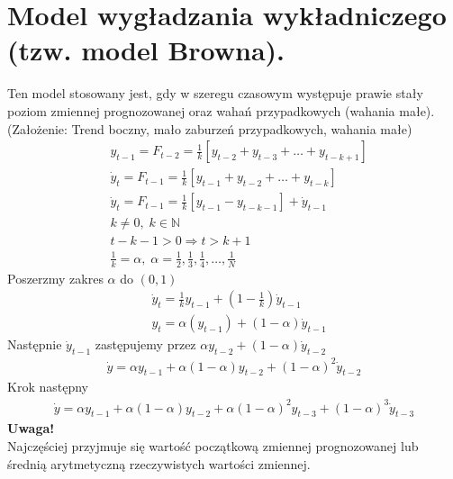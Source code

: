 \section{Model wygładzania wykładniczego (tzw. model Browna).}
Ten model stosowany jest, gdy w szeregu czasowym występuje prawie stały poziom zmiennej prognozowanej oraz wahań przypadkowych (wahania małe).\\
(Założenie: Trend boczny, mało zaburzeń przypadkowych, wahania małe)
\begin{align*}
&y_{t-1}=F_{t-2}=\frac{1}{k}\left[y_{t-2}+y_{t-3}+\dots+y_{t-k+1}\right]\\
&\dot y_t=F_{t-1}=\frac{1}{k}\left[y_{t-1}+y_{t-2}+\dots+y_{t-k}\right]\\
&\dot y_t=F_{t-1}=\frac{1}{k}\left[y_{t-1}-y_{t-k-1}\right]+\dot y_{t-1}\\
&k\neq 0,\; k\in \mathbb N\\
&t-k-1>0\Rightarrow t>k+1\\
&\frac{1}{k}=\alpha,\;\alpha=\frac{1}{2},\frac{1}{3},\frac{1}{4},\dots,\frac{1}{N}
\end{align*}
Poszerzmy zakres $ \alpha $ do $ (0,1) $
\begin{align*}
&\dot y_t=\frac{1}{k}y_{t-1}+\left(1-\frac{1}{k}\right)\dot y_{t-1}\\
&y_t=\alpha\left(y_{t-1}\right)+\left(1-\alpha\right)\dot y_{t-1}
\end{align*}
Następnie $ \dot y_{t-1} $ zastępujemy przez $ \alpha y_{t-2}+\left(1-\alpha\right)\dot y_{t-2}$
\begin{gather*}
\dot y=\alpha y_{t-1}+\alpha\left(1-\alpha\right)y_{t-2}+\left(1-\alpha\right)^2\dot y_{t-2}
\end{gather*}
Krok następny
\begin{gather*}
\dot y=\alpha y_{t-1}+\alpha\left(1-\alpha\right)y_{t-2}+\alpha\left(1-\alpha\right)^2y_{t-3}+\left(1-\alpha\right)^3\dot y_{t-3}
\end{gather*}
\textbf{Uwaga!}\\
Najczęściej przyjmuje się wartość początkową zmiennej prognozowanej lub średnią arytmetyczną rzeczywistych wartości zmiennej.